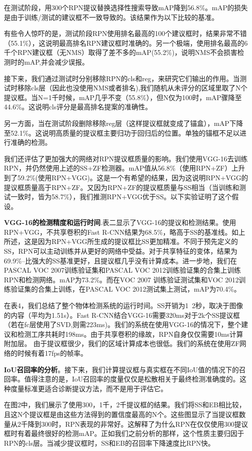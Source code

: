 \documentclass[12pt,a4paper,titlepage]{article}
\begin{document}
在测试阶段，用300个RPN提议替换选择性搜索导致mAP降到56.8\%。mAP的损失是由于训练/测试的建议框不一致导致的。该结果作为以下比较的基准。\par

有些令人惊吓的是，测试阶段RPN使用排名最高的100个建议框时，结果非常不错（55.1\%），这说明最高排名RPN建议框时准确的。另一个极端，使用排名最高的6千个RPN建议框（无NMS）取得了差不多的mAP(55.2\%)，说明NMS不会损害检测时的mAP,并会减少误报。\par

接下来，我们通过测试时分别移除RPN的cls和reg，来研究它们输出的作用。当测试时移除cls层（因此也没使用NMS或者排名),我们随机从未评分的区域里取了N个提议框。当N=1千时候，mAP几乎不变（55.8\%），但N仅为100时，mAP骤降至44.6\%。这说明cls评分是最高排名提案的准确性。\par

另一方面，当在测试阶段删除移除reg层（这样提议框就变成了锚盒），mAP下降至52.1\%。这说明高质量的提议框主要归功于回归后的位置。单独的锚框不足以进行准确的检测。\par

我们还评估了更加强大的网络对RPN提议框质量的影响。我们使用VGG-16去训练RPN，并仍然使用上述的SS+ZF检测器。mAP值从56.8\%（使用RPN+ZF）上升到了59.2\%(使用RPN+VGG)。这是一个有希望的结果，因为这说明RPN+VGG的提议框质量高于RPN+ZF。又因为RPN+ZF的提议框质量与SS相当（当训练和测试一致时，皆为58.7\%），我们推测RPN+VGG优于SS。以下实验证明了这个假设。

\textbf{VGG-16的检测精度和运行时间}.表二显示了VGG-16的提议和检测结果。使用RPN+VGG，不共享卷积的Fast R-CNN结果为68.5\%，略高于SS的基准线。如上所述，这是因为RPN+VGG所生成的提议框比SS更加精准。不同于预先定义的SS，RPN可以主动训练并从更好的网络中受益。对于共享特征的变体，结果为69.9\%--比强大的SS基准更好，且提议框几乎没有计算成本。进一步地，我们在PASCAL VOC 2007训练验证集和PASCAL VOC 2012训练验证集的合集上训练RPN和检测网络。mAP为73.2\%。而在VOC 2007 训练验证测试集和VOC 2012训练验证集的合集上训练，在PASCAL VOC 2012测试集上测试，mAP为70.4\%。  \par

在表4，我们总结了整个物体检测系统的运行时间。SS开销为1~2秒，取决于图像的内容（平均为1.51s）。Fast R-CNN结合VGG-16需要320ms对于2k个SS提议框（若在fc层使用了SVD,则需223ms)。我们的系统在使用VGG-16的情况下，整个建议和检测工序共耗时198ms。由于共享卷积的缘故，RPN自身仅仅需要10ms计算附加层。 由于提议框很少，我们的区域计算成本也很低。我们的系统在使用ZF网络的时候有着17fps的帧率。

\textbf{IoU召回率的分析}。接下来，我们计算提议框与真实框在不同IoU值的情况下的召回率。值得注意的是，IoU召回率的度量仅仅是松散相关于最终检测准确度的。这种度量标准更适合诊断提议方法，而不是用于评估它。\par

在图2中，我们展示了使用300，1千，2千提议框的结果。我们将SS和EB相比较，且这N个提议框是由这些方法得到的置信度最高的N个。这些图显示了当提议框数量从2千降到300时，RPN表现的非常好。这解释了为什么RPN在仅仅使用300提议框时有着最终很好的检测mAP。正如我们之前分析的那样，这个性质主要归因于RPN的cls层。当减少提议框时，SS和EB的召回率下降速度比RPN快。
\end{document}
